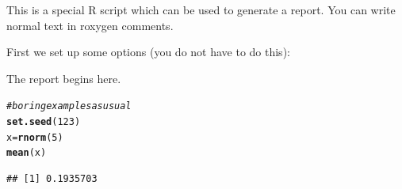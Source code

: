 \documentclass{article}\usepackage[]{graphicx}\usepackage[]{color}
\makeatletter
\newcommand{\hlnum}[1]{\textcolor[rgb]{0.686,0.059,0.569}{#1}}%
\newcommand{\hlcom}[1]{\textcolor[rgb]{0.678,0.584,0.686}{\textit{#1}}}%
\newcommand{\hlstd}[1]{\textcolor[rgb]{0.345,0.345,0.345}{#1}}%
\newcommand{\hlkwb}[1]{\textcolor[rgb]{0.69,0.353,0.396}{#1}}%
\newcommand{\hlkwd}[1]{\textcolor[rgb]{0.737,0.353,0.396}{\textbf{#1}}}%
\newenvironment{kframe}{%
 \def\at@end@of@kframe{}%
 \ifinner\ifhmode%
  \def\at@end@of@kframe{\end{minipage}}%
  \begin{minipage}{\columnwidth}%
 \fi\fi%
 \def\FrameCommand##1{\hskip\@totalleftmargin \hskip-\fboxsep
 \colorbox{shadecolor}{##1}\hskip-\fboxsep
     \hskip-\linewidth \hskip-\@totalleftmargin \hskip\columnwidth}%
 \MakeFramed {\advance\hsize-\width
   \@totalleftmargin\z@ \linewidth\hsize
   \@setminipage}}%
 {\par\unskip\endMakeFramed%
 \at@end@of@kframe}
\newenvironment{knitrout}{}{} %
\makeatother
\begin{document}
This is a special R script which can be used to generate a report. You can
write normal text in roxygen comments.

First we set up some options (you do not have to do this):



The report begins here.

\begin{knitrout}
\color{fgcolor}\begin{kframe}
\begin{alltt}
\hlcom{# boring examples as usual}
\hlkwd{set.seed}\hlstd{(}\hlnum{123}\hlstd{)}
\hlstd{x} \hlkwb{=} \hlkwd{rnorm}\hlstd{(}\hlnum{5}\hlstd{)}
\hlkwd{mean}\hlstd{(x)}
\end{alltt}
\begin{verbatim}
## [1] 0.1935703
\end{verbatim}
\end{kframe}
\end{knitrout}
\end{document}

